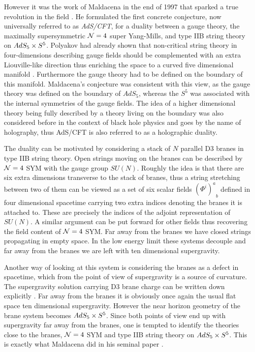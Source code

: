 However it was the work of Maldacena in the end of 1997 that sparked a true revolution in the field \cite{Maldacena:1997re}. 
He formulated the first concrete conjecture, now universally referred to as \emph{AdS/CFT}, for a duality between a gauge theory, the maximally supersymmetric $\mathcal{N}=4$ super Yang-Mills, and type IIB string theory on $AdS_5 \times S^5$. 
Polyakov had already shown that non-critical string theory in four-dimensions describing gauge fields should be complemented with an extra Liouville-like direction thus enriching the space to a curved five dimensional manifold \cite{Polyakov:1997tj}. Furthermore the gauge theory had to be defined on the boundary of this manifold.
Maldacena's conjecture was consistent with this view, as the gauge theory was defined on the boundary of $AdS_5$, whereas the $S^5$ was associated with the internal symmetries of the gauge fields.
The idea of a higher dimensional theory being fully described by a theory living on the boundary was also considered before in the context of black hole physics \cite{'tHooft:1993gx, Susskind:1994vu} and goes by the name of holography, thus AdS/CFT is also referred to as a holographic duality.

The duality can be motivated by considering a stack of $N$ parallel D3 branes in type IIB string theory. 
Open strings moving on the branes can be described by $\mathcal{N}=4$ SYM with the gauge group $SU(N)$. 
Roughly the idea is that there are six extra dimensions transverse to the stack of branes, thus a string stretching between two of them can be viewed as a set of six scalar fields ${(\Phi^i)^a}_b$ defined in four dimensional spacetime carrying two extra indices denoting the branes it is attached to. 
These are precisely the indices of the adjoint representation of $SU(N)$.
A similar argument can be put forward for other fields thus recovering the field content of $\mathcal{N}=4$ SYM.
Far away from the branes we have closed strings propagating in empty space. 
In the low energy limit these systems decouple and far away from the branes we are left with ten dimensional supergravity.

Another way of looking at this system is considering the branes as a defect in spacetime, which from the point of view of supergravity is a source of curvature. 
The supergravity solution carrying D3 brane charge can be written down explicitly \cite{Horowitz:1991cd}.
Far away from the branes it is obviously once again the usual flat space ten dimensional supergravity.
However the near horizon geometry of the brane system becomes $AdS_5 \times S^5$.
Since both points of view end up with supergravity far away from the branes, one is tempted to identify the theories close to the branes, $\mathcal{N}=4$ SYM and type IIB string theory on $AdS_5 \times S^5$. 
This is exactly what Maldacena did in his seminal paper \cite{Maldacena:1997re}. 


